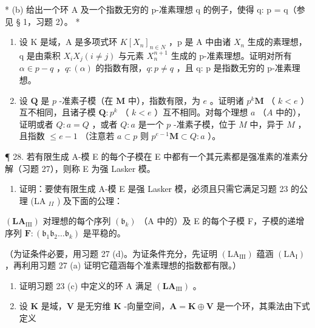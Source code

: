 * (b) 给出一个环 A 及一个指数无穷的 p-准素理想 q 的例子，使得 q: p = q（参见 § 1，习题 2）。 *

\begin{enumerate}
\def\labelenumi{(\alph{enumi})}
\setcounter{enumi}{2}
\item
  设 K 是域，A 是多项式环 \(K[X_{n}]_{n \in N}\) ，p 是 A 中由诸 \(X_{n}\) 生成的素理想，q 是由乘积 \(X_{i}X_{j} (i \neq j)\) 与元素 \(X_{n}^{n+1}\) 生成的 p-准素理想。证明对所有 \(\alpha \in p - q\) ，\(q: (\alpha)\) 的指数有限，\(q: p \neq q\) ，且 q: p 是指数无穷的 p-准素理想。
\item
  设 \(\mathbf{Q}\) 是 \(p\) -准素子模（在 \(\mathbf{M}\) 中），指数有限，为 \(e\) 。证明诸 \(p^k\mathbf{M}\) （ \(k < e\) ）互不相同，且诸子模 \(\mathbf{Q}: p^k\) （ \(k < e\) ）互不相同。对每个理想 \(a\) （\(A\) 中的），证明或者 \(Q: a = Q\) ，或者 \(Q: a\) 是一个 \(p\) -准素子模，位于 \(M\) 中，异于 \(M\) ，且指数 \(\leqslant e - 1\) （注意若 \(a \subset p\) 则 \(p^{e-1}\mathbf{M} \subset Q: a\) ）。
\end{enumerate}

¶ 28. 若有限生成 A-模 E 的每个子模在 E 中都有一个其元素都是强准素的准素分解（习题 27），则称 E 为强 Lasker 模。

\begin{enumerate}
\def\labelenumi{(\alph{enumi})}
\tightlist
\item
  证明：要使有限生成 A-模 E 是强 Lasker 模，必须且只需它满足习题 23 的公理 (LA \(_{II}\) ) 及下面的公理：
\end{enumerate}

\((\mathbf{L}\mathbf{A}_{\mathrm{III}})\) 对理想的每个序列 \((\mathfrak{b}_k)\) （A 中的）及 E 的每个子模 F，子模的递增序列 \(\mathbf{F}:(\mathfrak{b}_1\mathfrak{b}_2\dots \mathfrak{b}_k)\) 是平稳的。

（为证条件必要，用习题 27 (d)。为证条件充分，先证明 \((\mathrm{LA}_{\mathrm{III}})\) 蕴涵 \((\mathrm{LA}_{\mathrm{I}})\) ，再利用习题 27 (a) 证明它蕴涵每个准素理想的指数都有限。）

\begin{enumerate}
\def\labelenumi{(\alph{enumi})}
\setcounter{enumi}{1}
\item
  证明习题 23 (c) 中定义的环 A 满足 \((\mathbf{LA}_{\mathrm{III}})\) 。
\item
  设 \(\mathbf{K}\) 是域，\(\mathbf{V}\) 是无穷维 \(\mathbf{K}\) -向量空间，\(\mathbf{A} = \mathbf{K} \oplus \mathbf{V}\) 是一个环，其乘法由下式定义
\end{enumerate}

